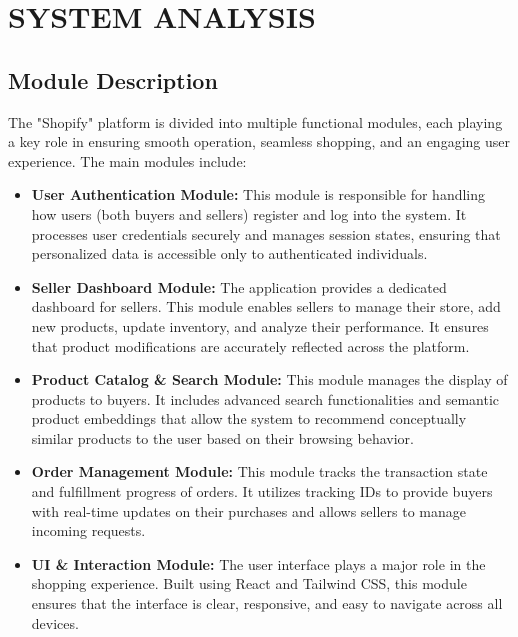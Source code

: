 \chapter{SYSTEM ANALYSIS }
 
 \section{Module Description}
 The "Shopify" platform is divided into multiple functional modules, each playing a key role in ensuring smooth operation, seamless shopping, and an engaging user experience. The main modules include:
 \begin{itemize}
    \item \textbf{User Authentication Module:} This module is responsible for handling how users (both buyers and sellers) register and log into the system. It processes user credentials securely and manages session states, ensuring that personalized data is accessible only to authenticated individuals.
    \item \textbf{Seller Dashboard Module:} The application provides a dedicated dashboard for sellers. This module enables sellers to manage their store, add new products, update inventory, and analyze their performance. It ensures that product modifications are accurately reflected across the platform.
    \item \textbf{Product Catalog \& Search Module:} This module manages the display of products to buyers. It includes advanced search functionalities and semantic product embeddings that allow the system to recommend conceptually similar products to the user based on their browsing behavior.
    \item \textbf{Order Management Module:} This module tracks the transaction state and fulfillment progress of orders. It utilizes tracking IDs to provide buyers with real-time updates on their purchases and allows sellers to manage incoming requests.
    \item \textbf{UI \& Interaction Module:} The user interface plays a major role in the shopping experience. Built using React and Tailwind CSS, this module ensures that the interface is clear, responsive, and easy to navigate across all devices.
\end{itemize}

